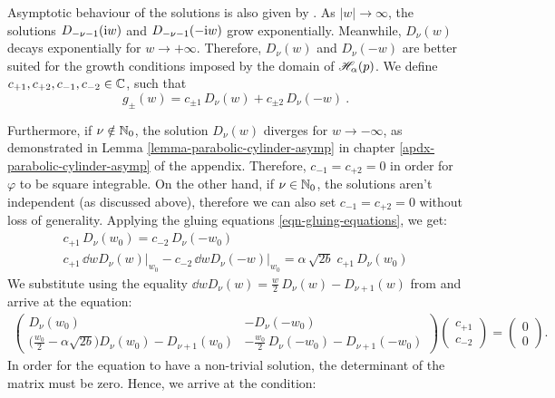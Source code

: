 Asymptotic behaviour of the solutions is also given by \cite{GradshteynRyzhik}. As $|w|\to\infty$, the solutions $D_{-\nu-1}(\mathrm{i} w)$ and $D_{-\nu-1}(-\mathrm{i} w)$ grow exponentially. Meanwhile, $D_\nu(w)$ decays exponentially for $w \to +\infty$. Therefore, $D_\nu(w)$ and $D_\nu(-w)$ are better suited for the growth conditions imposed by the domain of $\mathscr{H}_\alpha(p)$. We define $c_{+1}, c_{+2}, c_{-1}, c_{-2} \in \mathbb{C}$, such that
\begin{equation}
    g_\pm(w) = c_{\pm 1} \, D_\nu(w) + c_{\pm 2} \, D_\nu(-w) \: .
    \label{eqn-dirac-parabolic-cylinder-two-solutions}
\end{equation}

Furthermore, if $\nu \notin \mathbb{N}_0$, the solution $D_\nu(w)$ diverges for $w \to -\infty$, as demonstrated in Lemma \ref{lemma-parabolic-cylinder-asymp} in chapter \ref{apdx-parabolic-cylinder-asymp} of the appendix. Therefore, $c_{-1} = c_{+2} = 0$ in order for $\varphi$ to be square integrable. On the other hand, if $\nu \in \mathbb{N}_0$, the solutions aren't independent (as discussed above), therefore we can also set $c_{-1} = c_{+2} = 0$ without loss of generality. Applying the gluing equations \eqref{eqn-gluing-equations}, we get:
\begin{gather*}
    c_{+1} \, D_\nu(w_0) = c_{-2} \, D_\nu(-w_0) \\[5pt]
    c_{+1} \, \dd{}{w} D_\nu(w) \big|_{w_0} - c_{-2} \, \dd{}{w} D_\nu(-w) \big|_{w_0} = \alpha \, \sqrt{2b} \; c_{+1} \, D_\nu(w_0)
\end{gather*}
We substitute using the equality $\dd{}{w} D_\nu(w) = \frac{w}{2} \, D_\nu(w) - D_{\nu+1}(w)$ from \cite{GradshteynRyzhik} and arrive at the equation:
\begin{align*}
    \begin{pmatrix}
        D_\nu(w_0) & -D_\nu(-w_0) \\[5pt]
        \big( \frac{w_0}{2} \!-\! \alpha \sqrt{2b} \big)
        D_\nu(w_0) \!-\! D_{\nu+1}(w_0) &
        -\frac{w_0}{2} \, D_\nu(-w_0) \!-\! D_{\nu+1}(-w_0)
    \end{pmatrix}
    \begin{pmatrix}
        c_{+1} \\[5pt] c_{-2}
    \end{pmatrix}
    =
    \begin{pmatrix}
        0 \\[5pt] 0
    \end{pmatrix}
    .
\end{align*}
In order for the equation to have a non-trivial solution, the determinant of the matrix must be zero. Hence, we arrive at the condition:
